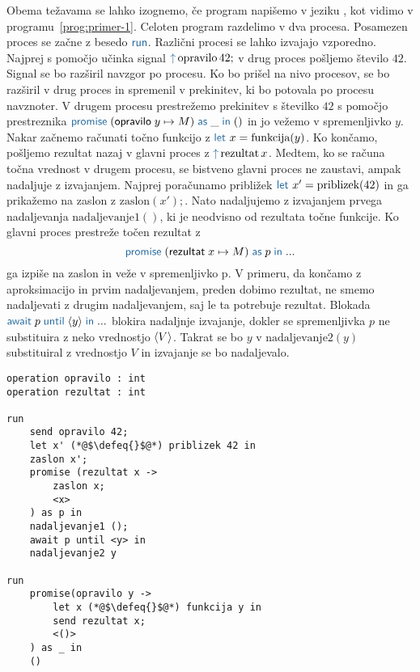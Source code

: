 Obema težavama se lahko izognemo, če program napišemo v jeziku \aeff, kot vidimo v programu~\ref{prog:primer-1}. Celoten program razdelimo v dva procesa. Posamezen proces se začne z besedo $\tmkw{run}$. Različni procesi se lahko izvajajo vzporedno.
Najprej s pomočjo učinka signal $\tmkw{\uparrow}\, \text{opravilo}\,42;$ v drug proces pošljemo število $42$. Signal se bo razširil navzgor po procesu. Ko bo prišel na nivo procesov, se bo razširil v drug proces in spremenil v prekinitev, ki bo potovala po procesu navznoter. V drugem procesu prestrežemo prekinitev s številko $42$ s pomočjo prestreznika $\tmwith{opravilo}{y}{M}{\_}{()}$ in jo vežemo v spremenljivko $y$. Nakar začnemo računati točno funkcijo z $\tmkw{let}\ x = \text{funkcija}(y)$. Ko končamo, pošljemo rezultat nazaj v glavni proces z $\tmkw{\uparrow}\, \text{rezultat}\,x$.
Medtem, ko se računa točna vrednost v drugem procesu, se bistveno glavni proces ne zaustavi, ampak nadaljuje z izvajanjem. Najprej poračunamo približek $\tmkw{let}\ x' = \text{priblizek}(42)$ in ga prikažemo na zaslon z $\text{zaslon}(x');$. Nato nadaljujemo z izvajanjem prvega nadaljevanja $\text{nadaljevanje}1()$, ki je neodvisno od rezultata točne funkcije. Ko glavni proces prestreže točen rezultat z $$\tmwith{rezultat}{x}{M}{p}{...}$$ ga izpiše na zaslon in veže v spremenljivko p. V primeru, da končamo z aproksimacijo in prvim nadaljevanjem, preden dobimo rezultat, ne smemo nadaljevati z drugim nadaljevanjem, saj le ta potrebuje rezultat. Blokada $\tmawait{p}{y}{...}$ blokira nadaljnje izvajanje, dokler se spremenljivka $p$ ne substituira z neko vrednostjo $\langle V \rangle$. Takrat se bo $y$ v $\text{nadaljevanje}2(y)$ substituiral z vrednostjo $V$ in izvajanje se bo nadaljevalo.

\begin{lstlisting}[caption={Asinhron vzporeden primer.},label={prog:primer-1},floatplacement=H]
operation opravilo : int
operation rezultat : int

run 
	send opravilo 42;
	let x' (*@$\defeq{}$@*) priblizek 42 in
	zaslon x';
	promise (rezultat x ->
	   	zaslon x;
	   	<x>
	) as p in
	nadaljevanje1 ();
	await p until <y> in
	nadaljevanje2 y

run 
	promise(opravilo y ->
	   	let x (*@$\defeq{}$@*) funkcija y in
	   	send rezultat x;
	   	<()>
	) as _ in
	()
\end{lstlisting}




